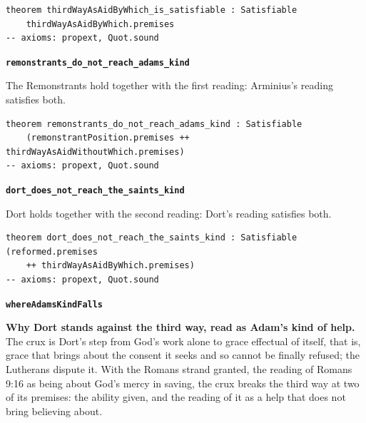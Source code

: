 \documentclass[11pt]{article}
\begin{document}
{\small\begin{verbatim}
theorem thirdWayAsAidByWhich_is_satisfiable : Satisfiable
    thirdWayAsAidByWhich.premises
-- axioms: propext, Quot.sound
\end{verbatim}}
\par\medskip\noindent\textbf{\texttt{remonstrants\_\allowbreak{}do\_\allowbreak{}not\_\allowbreak{}reach\_\allowbreak{}adams\_\allowbreak{}kind}}\par\nobreak\noindent
The Remonstrants hold together with the first reading: Arminius’s reading satisfies both.

{\small\begin{verbatim}
theorem remonstrants_do_not_reach_adams_kind : Satisfiable
    (remonstrantPosition.premises ++ thirdWayAsAidWithoutWhich.premises)
-- axioms: propext, Quot.sound
\end{verbatim}}
\par\medskip\noindent\textbf{\texttt{dort\_\allowbreak{}does\_\allowbreak{}not\_\allowbreak{}reach\_\allowbreak{}the\_\allowbreak{}saints\_\allowbreak{}kind}}\par\nobreak\noindent
Dort holds together with the second reading: Dort’s reading satisfies both.

{\small\begin{verbatim}
theorem dort_does_not_reach_the_saints_kind : Satisfiable (reformed.premises
    ++ thirdWayAsAidByWhich.premises)
-- axioms: propext, Quot.sound
\end{verbatim}}
\par\medskip\noindent\textbf{\texttt{where\allowbreak{}Adams\allowbreak{}Kind\allowbreak{}Falls}}\par\nobreak\noindent
\textbf{Why Dort stands against the third way, read as Adam’s kind of help.} The crux is Dort’s step from God’s work alone to grace effectual of itself, that is, grace that brings about the consent it seeks and so cannot be finally refused; the Lutherans dispute it. With the Romans strand granted, the reading of Romans 9:16 as being about God’s mercy in saving, the crux breaks the third way at two of its premises: the ability given, and the reading of it as a help that does not bring believing about.
\end{document}
